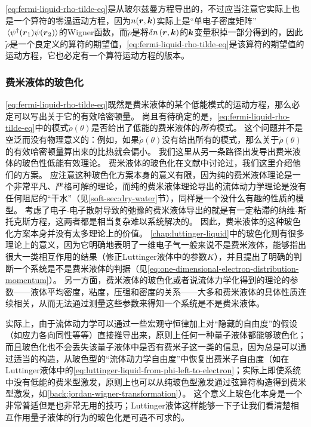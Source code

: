 \eqref{eq:fermi-liquid-rho-tilde-eq}是从玻尔兹曼方程导出的，不过应当注意它实际上也是一个算符的零温运动方程，因为$n(\vb*{r}, \vb*{k})$实际上是“单电子密度矩阵”$\expval*{\psi^\dagger(\vb*{r}_1) \psi(\vb*{r}_2)}$的Wigner函数，而$\tilde{\rho}$是将$\var{n}(\vb*{r}, \vb*{k})$的$\vb*{k}$变量积掉一部分得到的，因此$\tilde{\rho}$是一个良定义的算符的期望值，\eqref{eq:fermi-liquid-rho-tilde-eq}是该算符的期望值的运动方程，它也必定有一个算符运动方程的版本。

\subsubsection{费米液体的玻色化}

\eqref{eq:fermi-liquid-rho-tilde-eq}既然是费米液体的某个低能模式的运动方程，那么必定可以写出关于它的有效哈密顿量。
尚且有待确定的是，\eqref{eq:fermi-liquid-rho-tilde-eq}中的模式$\tilde{\rho}(\theta)$是否给出了低能的费米液体的\emph{所有}模式。
这个问题并不是空泛而没有物理意义的：例如，如果$\tilde{\rho}(\theta)$没有给出所有的模式，那么关于$\tilde{\rho}(\theta)$的有效哈密顿量算出来的比热就会偏小。
我们这里从另一条路径出发导出费米液体的玻色性低能有效理论。
费米液体的玻色化在文献\cite{haldane-boson, Castro_Neto_1994,wen-qft}中讨论过，我们这里介绍他们的方案。
应注意这种玻色化方案本身的意义有限，因为纯的费米液体理论是一个非常平凡、严格可解的理论，而纯的费米液体理论导出的流体动力学理论是没有任何阻尼的“干水”（见\ref{soft-sec:dry-water}节），同样是一个没什么有趣的性质的模型。
考虑了电子-电子散射导致的弛豫的费米液体导出的就是有一定粘滞的纳维-斯托克斯方程\cite{sykes1970transport}，这两者都是相当复杂难以系统解决的。
因此，费米液体的这种玻色化方案本身并没有太多理论上的价值。
\autoref{chap:luttinger-liquid}中的玻色化则有很多理论上的意义，因为它明确地表明了一维电子气一般来说不是费米液体，能够指出很大一类相互作用的结果（修正Luttinger液体中的参数$K$），并且提出了明确的判断一个系统是不是费米液体的判据（见\eqref{eq:one-dimensional-electron-distribution-momentum}）。
另一方面，费米液体的玻色化或者说流体力学化得到的理论的参数——液体平均密度，粘度，压强和密度的关系——大多和费米液体的具体性质连续相关，从而无法通过测量这些参数来得知一个系统是不是费米液体。

实际上，由于流体动力学可以通过一些宏观守恒律加上对“隐藏的自由度”的假设（如应力各向同性等等）直接推导出来，原则上任何一种量子液体都能够玻色化；而且玻色化也不会丢失该量子液体中是否有费米子这一类的信息，因为总是可以通过适当的构造，从玻色型的“流体动力学自由度”中恢复出费米子自由度（如在Luttinger液体中的\eqref{eq:luttinger-liquid-from-phi-left-to-electron}；实际上即使系统中没有低能的费米型激发，原则上也可以从纯玻色型激发通过弦算符构造得到费米型激发，如\autoref{back:jordan-wigner-transformation}）。
这个意义上玻色化本身是一个非常普适但是也非常无用的技巧；Luttinger液体这样能够一下子让我们看清楚相互作用量子液体的行为的玻色化是可遇不可求的。

